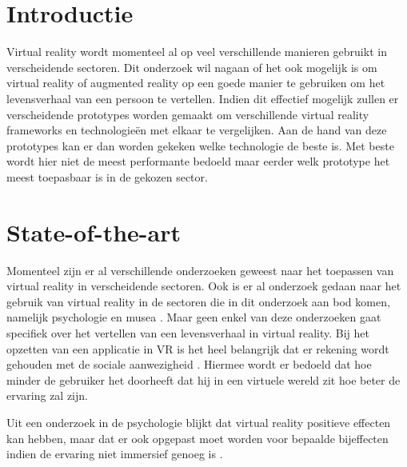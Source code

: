 
\section{Introductie} %
\label{sec:introductie}

Virtual reality wordt momenteel al op veel verschillende manieren gebruikt in verscheidende sectoren. Dit onderzoek wil nagaan of het ook mogelijk is om virtual reality of augmented reality op een goede manier te gebruiken om het levensverhaal van een persoon te vertellen. Indien dit effectief mogelijk zullen er verscheidende prototypes worden gemaakt om verschillende virtual reality frameworks en technologieën met elkaar te vergelijken. Aan de hand van deze prototypes kan er dan worden gekeken welke technologie de beste is. Met beste wordt hier niet de meest performante bedoeld maar eerder welk prototype het meest toepasbaar is in de gekozen sector.


\section{State-of-the-art}
\label{sec:state-of-the-art}

Momenteel zijn er al verschillende onderzoeken geweest naar het toepassen van virtual reality in verscheidende sectoren. Ook is er al onderzoek gedaan naar het gebruik van virtual reality in de sectoren die in dit onderzoek aan bod komen, namelijk psychologie \autocite{Wilson2014} en musea \autocite{Jung2016}. Maar geen enkel van deze onderzoeken gaat specifiek over het vertellen van een levensverhaal in virtual reality.
Bij het opzetten van een applicatie in VR is het heel belangrijk dat er rekening wordt gehouden met de sociale aanwezigheid \autocite{Jung2016}. Hiermee wordt er bedoeld dat hoe minder de gebruiker het doorheeft dat hij in een virtuele wereld zit hoe beter de ervaring zal zijn.   

Uit een onderzoek in de psychologie blijkt dat virtual reality positieve effecten kan hebben, maar dat er ook opgepast moet worden voor bepaalde bijeffecten indien de ervaring niet immersief genoeg is \autocite{Wilson2014}.

